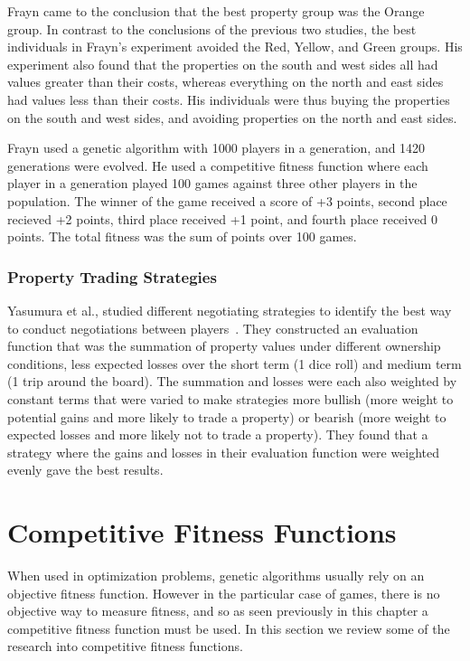 Frayn came to the conclusion that the best property group was the Orange group.
In contrast to the conclusions of the previous two studies, the best individuals
in Frayn's experiment avoided the Red, Yellow, and Green groups. His experiment
also found that the properties on the south and west sides all had values
greater than their costs, whereas everything on the north and east sides had
values less than their costs. His individuals were thus buying the properties on
the south and west sides, and avoiding properties on the north and east sides.

Frayn used a genetic algorithm with 1000 players in a generation, and
1420 generations were evolved. He used a competitive fitness function where each
player in a generation played 100 games against three other players in the
population. The winner of the game received a score of +3 points, second place
recieved +2 points, third place received +1 point, and fourth place received 0
points. The total fitness was the sum of points over 100 games.

\subsubsection{Property Trading Strategies}

Yasumura et al., studied different negotiating strategies to identify the best
way to conduct negotiations between players~\cite{Yasumura2001Negotiate}. They
constructed an evaluation function that was the summation of property values
under different ownership conditions, less expected losses over the short term
(1 dice roll) and medium term (1 trip around the board). The summation and
losses were each also weighted by constant terms that were varied to make
strategies more bullish (more weight to potential gains and more likely to trade
a property) or bearish (more weight to expected losses and more likely not to
trade a property). They found that a strategy where the gains and losses in
their evaluation function were weighted evenly gave the best results.

\section{Competitive Fitness Functions}

When used in optimization problems, genetic algorithms usually rely on an
objective fitness function. However in the particular case of games, there is no
objective way to measure fitness, and so as seen previously in this chapter a
competitive fitness function must be used. In this section we review some of the
research into competitive fitness functions.

